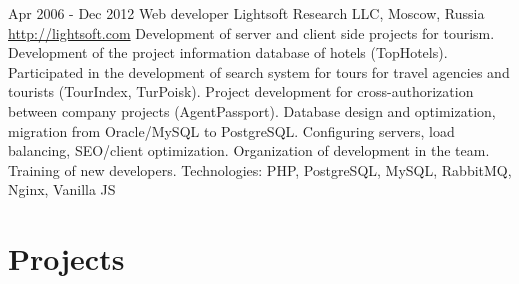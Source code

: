 \documentclass[11pt,a4paper]{moderncv}
\begin{document}
\cventry
  {Apr 2006 - Dec 2012}
  {Web developer}
  {Lightsoft Research LLC, Moscow, Russia}
  {\newline{}\url{http://lightsoft.com}}{}
  {Development of server and client side projects for tourism.\newline{}
  Development of the project information database of hotels (TopHotels).\newline{}
  Participated in the development of search system for tours for travel agencies and tourists (TourIndex, TurPoisk).\newline{}
  Project development for cross-authorization between company projects (AgentPassport).\newline{}
  Database design and optimization, migration from Oracle/MySQL to PostgreSQL. Configuring servers, load balancing, SEO/client optimization.\newline{}
  Organization of development in the team. Training of new developers.\newline{}
  Technologies: PHP, PostgreSQL, MySQL, RabbitMQ, Nginx, Vanilla JS}

\newpage

\section{Projects}
\end{document}
